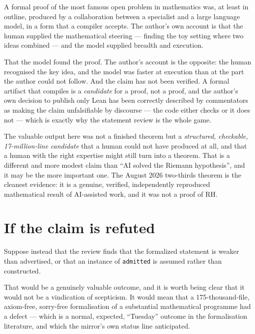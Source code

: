 \begin{description}[style=nextline,leftmargin=0pt,labelwidth=0pt,labelsep=0pt,font=\sffamily\bfseries\small,
  itemsep=5pt]
\item[\textbf{What it shows.}] A formal proof of the most famous open problem
in mathematics was, at least in outline, produced by a collaboration between a
specialist and a large language model, in a form that a compiler accepts. The
author's own account is that the human supplied the mathematical steering ---
finding the toy setting where two ideas combined --- and the model supplied
breadth and execution.

\item[\textbf{What it does not show.}] That the model found the proof. The
author's account is the opposite: the human recognised the key idea, and the
model was faster at execution than at the part the author could not follow.
And the claim has not been verified. A formal artifact that compiles is a
\emph{candidate} for a proof, not a proof, and the author's own decision to
publish only Lean has been correctly described by commentators as making the
claim unfalsifiable by discourse --- the code either checks or it does not ---
which is exactly why the statement review is the whole game.

\item[\textbf{The general lesson.}] The valuable output here was not a
finished theorem but a \emph{structured, checkable, 17-million-line candidate}
that a human could not have produced at all, and that a human with the right
expertise might still turn into a theorem. That is a different and more
modest claim than ``AI solved the Riemann hypothesis'', and it may be the
more important one. The August 2026 two-thirds theorem is the cleanest
evidence: it is a genuine, verified, independently reproduced mathematical
result of AI-assisted work, and it was not a proof of RH.
\end{description}

\section{If the claim is refuted}Suppose instead that the review finds that the formalized statement is
weaker than advertised, or that an instance of \texttt{admitted} is assumed
rather than constructed.

That would be a genuinely valuable outcome, and it is worth being clear that
it would not be a vindication of scepticism. It would mean that a
175-thousand-file, axiom-free, sorry-free formalisation of a substantial
mathematical programme had a defect --- which is a normal, expected,
``Tuesday'' outcome in the formalisation literature, and which the mirror's
own status line anticipated.

